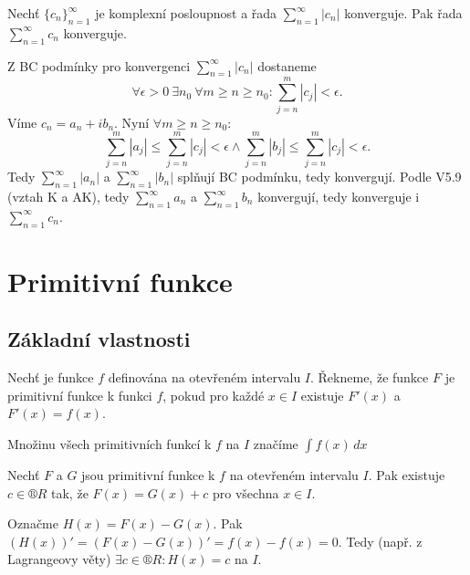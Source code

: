 \documentclass[12pt]{article}                   %
\begin{document}
        \begin{veta}
            Nechť $\{c_n\}_{n = 1}^∞$ je komplexní posloupnost a řada $\sum_{n=1}^∞ |c_n|$ konverguje. Pak řada $\sum_{n=1}^∞ c_n$ konverguje.

            \begin{dukazin}
                Z BC podmínky pro konvergenci $\sum_{n=1}^∞ |c_n|$ dostaneme
                $$ \forall \epsilon > 0\ \exists n_0\ \forall m ≥ n ≥ n_0: \sum_{j=n}^m |c_j| < \epsilon. $$ 
                Víme $c_n = a_n + ib_n$. Nyní $\forall m ≥ n ≥ n_0:$
                $$ \sum_{j=n}^m |a_j| ≤ \sum_{j=n}^m |c_j| < \epsilon \land \sum_{j=n}^m |b_j| ≤ \sum_{j=n}^m |c_j| < \epsilon. $$ 
                Tedy $\sum_{n=1}^∞ |a_n|$ a $\sum_{n=1}^∞ |b_n|$ splňují BC podmínku, tedy konvergují. Podle V5.9 (vztah K a AK), tedy $\sum_{n=1}^∞ a_n$ a $\sum_{n=1}^∞ b_n$ konvergují, tedy konverguje i $\sum_{n=1}^∞ c_n$.
            \end{dukazin}
        \end{veta}


\section{Primitivní funkce}
    \subsection{Základní vlastnosti}
        \begin{definice}
            Nechť je funkce $f$ definována na otevřeném intervalu $I$. Řekneme, že funkce $F$ je primitivní funkce k funkci $f$, pokud pro každé $x\in I$ existuje $F'(x)$ a $F'(x) = f(x)$.

            Množinu všech primitivních funkcí k $f$ na $I$ značíme $\int f(x)\, dx$
        \end{definice}

        \begin{veta}
            Nechť $F$ a $G$ jsou primitivní funkce k $f$ na otevřeném intervalu $I$. Pak existuje $c \in ®R$ tak, že $F(x) = G(x)+c$ pro všechna $x \in I$.

            \begin{dukazin}
                Označme $H(x) = F(x) - G(x)$. Pak $(H(x))' = (F(x) - G(x))' = f(x) - f(x) = 0$. Tedy (např. z Lagrangeovy věty) $\exists c \in ®R: H(x) = c$ na $I$.
            \end{dukazin}
        \end{veta}
\end{document}
